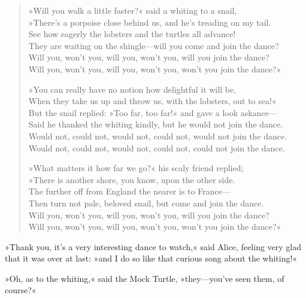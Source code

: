 \begin{verse}
»Will you walk a little faster?« said a whiting to a snail,\\
»There's a porpoise close behind us, and he's treading on my tail.\\
See how eagerly the lobsters and the turtles all advance!\\
They are waiting on the shingle—will you come and join the dance?\\
\hspace{1em}Will you, won't you, will you, won't you, will you join the dance?\\
\hspace{1em}Will you, won't you, will you, won't you, won't you join the dance?«

»You can really have no notion how delightful it will be,\\
When they take us up and throw us, with the lobsters, out to sea!«\\
But the snail replied: »Too far, too far!« and gave a look askance—\\
Said he thanked the whiting kindly, but he would not join the dance.\\
\hspace{1em}Would not, could not, would not, could not, would not join the dance.\\
\hspace{1em}Would not, could not, would not, could not, could not join the dance.

»What matters it how far we go?« his scaly friend replied;\\
»There is another shore, you know, upon the other side.\\
The further off from England the nearer is to France—\\
Then turn not pale, beloved snail, but come and join the dance.\\
\hspace{1em}Will you, won't you, will you, won't you, will you join the dance?\\
\hspace{1em}Will you, won't you, will you, won't you, won't you join the dance?«\\
\end{verse}

»Thank you, it's a very interesting dance to watch,« said Alice, feeling very glad that it was over at last: »and I do so like that curious song about the whiting!«

»Oh, as to the whiting,« said the Mock Turtle, »they—you've seen them, of course?«

